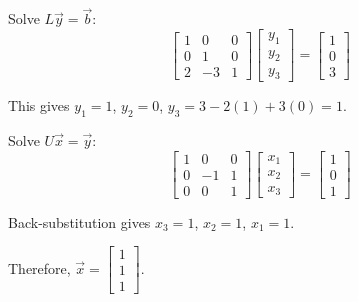 \documentclass[reqno, answers]{exam}
\begin{document}
\begin{questions}
\begin{solution}
    Solve $L\vec{y} = \vec{b}$:
    $$\begin{bmatrix} 1 & 0 & 0 \\ 0 & 1 & 0 \\ 2 & -3 & 1 \end{bmatrix} \begin{bmatrix} y_1 \\ y_2 \\ y_3 \end{bmatrix} = \begin{bmatrix} 1 \\ 0 \\ 3 \end{bmatrix}$$
    
    This gives $y_1 = 1$, $y_2 = 0$, $y_3 = 3 - 2(1) + 3(0) = 1$.

    Solve $U\vec{x} = \vec{y}$:
    $$\begin{bmatrix} 1 & 0 & 0 \\ 0 & -1 & 1 \\ 0 & 0 & 1 \end{bmatrix} \begin{bmatrix} x_1 \\ x_2 \\ x_3 \end{bmatrix} = \begin{bmatrix} 1 \\ 0 \\ 1 \end{bmatrix}$$
    
    Back-substitution gives $x_3 = 1$, $x_2 = 1$, $x_1 = 1$.
    
    Therefore, $\vec{x} = \begin{bmatrix} 1 \\ 1 \\ 1 \end{bmatrix}$.
  \end{solution}




\end{questions}
\end{document}
